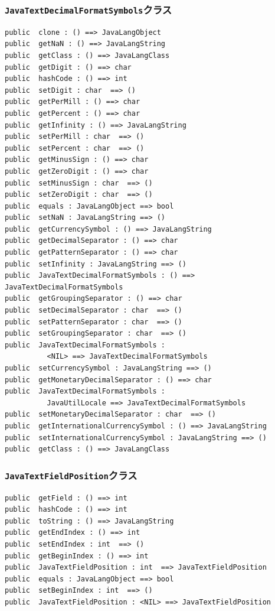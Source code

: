 \documentclass[\pformat,12pt]{jarticle}
\begin{document}
\subsubsection{\texttt{JavaTextDecimalFormatSymbols}クラス}
\begin{small}
\begin{verbatim}
public  clone : () ==> JavaLangObject
public  getNaN : () ==> JavaLangString
public  getClass : () ==> JavaLangClass
public  getDigit : () ==> char
public  hashCode : () ==> int
public  setDigit : char  ==> ()
public  getPerMill : () ==> char
public  getPercent : () ==> char
public  getInfinity : () ==> JavaLangString
public  setPerMill : char  ==> ()
public  setPercent : char  ==> ()
public  getMinusSign : () ==> char
public  getZeroDigit : () ==> char
public  setMinusSign : char  ==> ()
public  setZeroDigit : char  ==> ()
public  equals : JavaLangObject ==> bool
public  setNaN : JavaLangString ==> ()
public  getCurrencySymbol : () ==> JavaLangString
public  getDecimalSeparator : () ==> char
public  getPatternSeparator : () ==> char
public  setInfinity : JavaLangString ==> ()
public  JavaTextDecimalFormatSymbols : () ==> JavaTextDecimalFormatSymbols
public  getGroupingSeparator : () ==> char
public  setDecimalSeparator : char  ==> ()
public  setPatternSeparator : char  ==> ()
public  setGroupingSeparator : char  ==> ()
public  JavaTextDecimalFormatSymbols : 
          <NIL> ==> JavaTextDecimalFormatSymbols
public  setCurrencySymbol : JavaLangString ==> ()
public  getMonetaryDecimalSeparator : () ==> char
public  JavaTextDecimalFormatSymbols : 
          JavaUtilLocale ==> JavaTextDecimalFormatSymbols
public  setMonetaryDecimalSeparator : char  ==> ()
public  getInternationalCurrencySymbol : () ==> JavaLangString
public  setInternationalCurrencySymbol : JavaLangString ==> ()
public  getClass : () ==> JavaLangClass
\end{verbatim}
\end{small}

\subsubsection{\texttt{JavaTextFieldPosition}クラス}
\begin{small}
\begin{verbatim}
public  getField : () ==> int
public  hashCode : () ==> int
public  toString : () ==> JavaLangString
public  getEndIndex : () ==> int
public  setEndIndex : int  ==> ()
public  getBeginIndex : () ==> int
public  JavaTextFieldPosition : int  ==> JavaTextFieldPosition
public  equals : JavaLangObject ==> bool
public  setBeginIndex : int  ==> ()
public  JavaTextFieldPosition : <NIL> ==> JavaTextFieldPosition
\end{verbatim}
\end{small}
\end{document}
